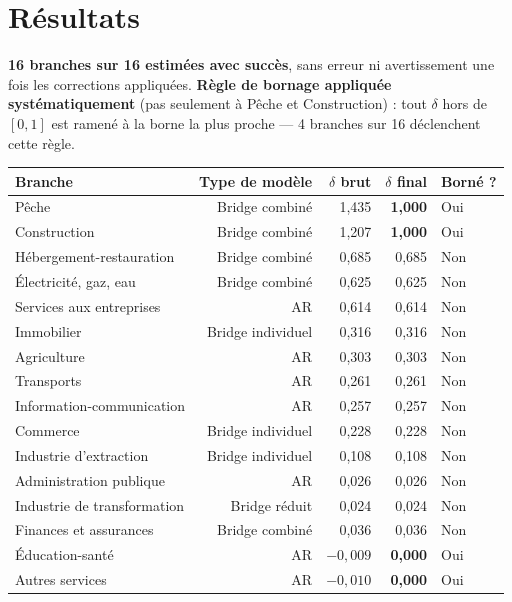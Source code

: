 \documentclass[11pt,a4paper]{article}
\begin{document}
\section{Résultats}

\begin{resultatbox}
\textbf{16 branches sur 16 estimées avec succès}, sans erreur ni avertissement une fois les corrections appliquées. \textbf{Règle de bornage appliquée systématiquement} (pas seulement à Pêche et Construction) : tout $\delta$ hors de $[0,1]$ est ramené à la borne la plus proche --- 4 branches sur 16 déclenchent cette règle.
\end{resultatbox}

\begin{center}
\small
\begin{tabular}{lrrrl}
\toprule
\textbf{Branche} & \textbf{Type de modèle} & \textbf{$\delta$ brut} & \textbf{$\delta$ final} & \textbf{Borné ?} \\
\midrule
Pêche & Bridge combiné & 1,435 & \textbf{1,000} & Oui \\
Construction & Bridge combiné & 1,207 & \textbf{1,000} & Oui \\
Hébergement-restauration & Bridge combiné & 0,685 & 0,685 & Non \\
Électricité, gaz, eau & Bridge combiné & 0,625 & 0,625 & Non \\
Services aux entreprises & AR & 0,614 & 0,614 & Non \\
Immobilier & Bridge individuel & 0,316 & 0,316 & Non \\
Agriculture & AR & 0,303 & 0,303 & Non \\
Transports & AR & 0,261 & 0,261 & Non \\
Information-communication & AR & 0,257 & 0,257 & Non \\
Commerce & Bridge individuel & 0,228 & 0,228 & Non \\
Industrie d'extraction & Bridge individuel & 0,108 & 0,108 & Non \\
Administration publique & AR & 0,026 & 0,026 & Non \\
Industrie de transformation & Bridge réduit & 0,024 & 0,024 & Non \\
Finances et assurances & Bridge combiné & 0,036 & 0,036 & Non \\
Éducation-santé & AR & $-0{,}009$ & \textbf{0,000} & Oui \\
Autres services & AR & $-0{,}010$ & \textbf{0,000} & Oui \\
\bottomrule
\end{tabular}
\end{center}
\end{document}
